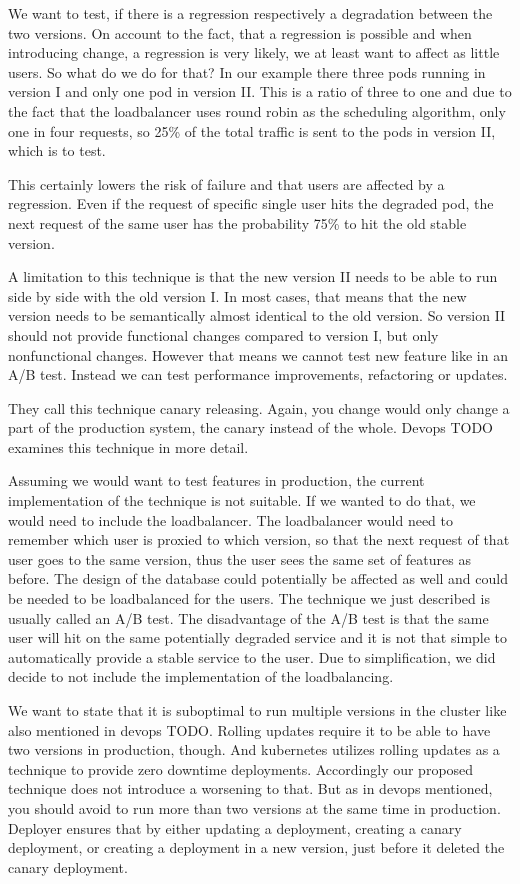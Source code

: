 We want to test, if there is a regression respectively a degradation between the two
versions. On account to the fact, that a regression is possible and when introducing
change, a regression is very likely, we at least want to affect as little users. So what
do we do for that? In our example there three pods running in version I and only one pod
in version II. This is a ratio of three to one and due to the fact that the loadbalancer
uses round robin as the scheduling algorithm, only one in four requests, so 25\% of the
total traffic is sent to the pods in version II, which is to test.

This certainly lowers the risk of failure and that users are affected by a
regression. Even if the request of specific single user hits the degraded pod, the next
request of the same user has the probability 75\% to hit the old stable version.

A limitation to this technique is that the new version II needs to be able to run side by
side with the old version I. In most cases, that means that the new version needs to be
semantically almost identical to the old version. So version II should not provide
functional changes compared to version I, but only nonfunctional changes. However that
means we cannot test new feature like in an A/B test. Instead we can test performance
improvements, refactoring or updates.

They call this technique canary releasing. Again, you change would only change a part of
the production system, the canary instead of the whole. Devops TODO examines this
technique in more detail.

Assuming we would want to test features in production, the current implementation of the
technique is not suitable. If we wanted to do that, we would need to include the
loadbalancer. The loadbalancer would need to remember which user is proxied to which
version, so that the next request of that user goes to the same version, thus the user
sees the same set of features as before. The design of the database could potentially be
affected as well and could be needed to be loadbalanced for the users. The technique we
just described is usually called an A/B test. The disadvantage of the A/B test is that the
same user will hit on the same potentially degraded service and it is not that simple to
automatically provide a stable service to the user. Due to simplification, we did decide
to not include the implementation of the loadbalancing.

We want to state that it is suboptimal to run multiple versions in the cluster like also
mentioned in devops TODO. Rolling updates require it to be able to have two versions in
production, though. And kubernetes utilizes rolling updates as a technique to provide zero
downtime deployments. Accordingly our proposed technique does not introduce a worsening to
that. But as in devops mentioned, you should avoid to run more than two versions at the
same time in production. Deployer ensures that by either updating a deployment, creating a
canary deployment, or creating a deployment in a new version, just before it deleted the
canary deployment.

